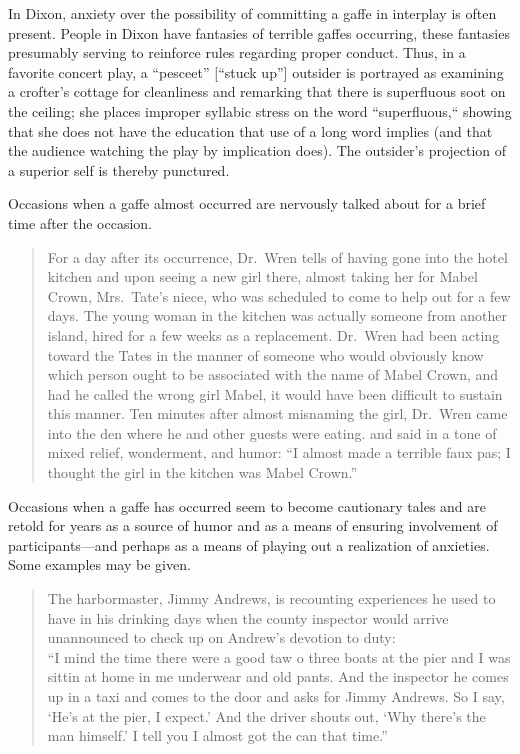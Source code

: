 \documentclass[twoside,symmetric,nobib,justified]{tufte-book}
\begin{document}
In Dixon, anxiety over the possibility of committing a gaffe in
interplay is often present. People in Dixon have fantasies of terrible
gaffes occurring, these fantasies presumably serving to reinforce rules
regarding proper conduct. Thus, in a favorite concert play, a
``pesceet'' {[}``stuck up''{]} outsider is portrayed as examining a
crofter's cottage for cleanliness and remarking that there is
superfluous soot on the ceiling; she places improper syllabic stress on
the word ``superfluous,`` showing that she does not have the education
that use of a long word implies (and that the audience watching the play
by implication does). The outsider's projection of a superior self is
thereby punctured.

Occasions when a gaffe almost occurred are nervously talked about for a
brief time after the occasion.

\begin{quote}
For a day after its occurrence, Dr.~Wren tells of having gone into the
hotel kitchen and upon seeing a new girl there, almost taking her for
Mabel Crown, Mrs.~Tate's niece, who was scheduled to come to help out
for a few days. The young woman in the kitchen was actually someone from
another island, hired for a few weeks as a replacement. Dr.~Wren had
been acting toward the Tates in the manner of someone who would
obviously know which person ought to be associated with the name of
Mabel Crown, and had he called the wrong girl Mabel, it would have been
difficult to sustain this manner. Ten minutes after almost misnaming the
girl, Dr.~Wren came into the den where he and other guests were eating.
and said in a tone of mixed relief, wonderment, and humor: ``I almost
made a terrible faux pas; I thought the girl in the kitchen was Mabel
Crown.''
\end{quote}

\noindent Occasions when a gaffe has occurred seem to become cautionary tales and
are retold for years as a source of humor and as a means of ensuring
involvement of participants---and perhaps as a means of playing out a
realization of anxieties. Some examples may be given.

\begin{quote}
The harbormaster, Jimmy Andrews, is recounting experiences he used to
have in his drinking days when the county inspector would arrive
unannounced to check up on Andrew's devotion to duty:\\
``I mind the time there were a good taw o three boats at the pier and I
was sittin at home in me underwear and old pants. And the inspector he
comes up in a taxi and comes to the door and asks for Jimmy Andrews. So
I say, `He's at the pier, I expect.' And the driver shouts out, `Why
there's the man himself.' I tell you I almost got the can that time.''
\end{quote}
\end{document}
